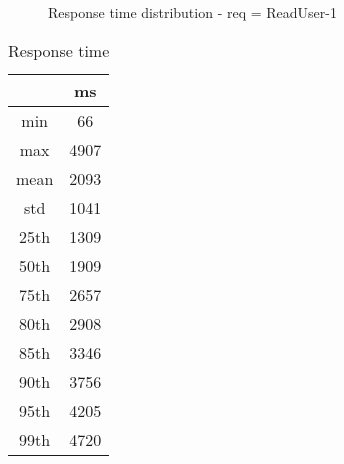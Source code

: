 \begin{minipage}{0.75\linewidth}
\begin{figure}[h]
\begin{adjustbox}{max width=1.0\linewidth, keepaspectratio}
  \end{adjustbox}
  \caption{Response time distribution - req = ReadUser-1}
\end{figure}
\end{minipage}\hfill\begin{minipage}{0.18\linewidth}
\begin{table}[h]
\begin{tabular}{|cc|}
\hline
\textbf{} & \textbf{ms}\\ \hline
 \Xhline{0.005\arrayrulewidth}
min & 66\\
 \Xhline{0.005\arrayrulewidth}
max & 4907\\
 \Xhline{0.005\arrayrulewidth}
mean & 2093\\
 \Xhline{0.005\arrayrulewidth}
std & 1041\\
\hline
\hline
 \Xhline{0.005\arrayrulewidth}
25th & 1309\\
 \Xhline{0.005\arrayrulewidth}
50th & 1909\\
 \Xhline{0.005\arrayrulewidth}
75th & 2657\\
 \Xhline{0.005\arrayrulewidth}
80th & 2908\\
 \Xhline{0.005\arrayrulewidth}
85th & 3346\\
 \Xhline{0.005\arrayrulewidth}
90th & 3756\\
 \Xhline{0.005\arrayrulewidth}
95th & 4205\\
 \Xhline{0.005\arrayrulewidth}
99th & 4720\\
\hline
\end{tabular}
\caption{Response time}
\end{table}
\end{minipage}\hfill